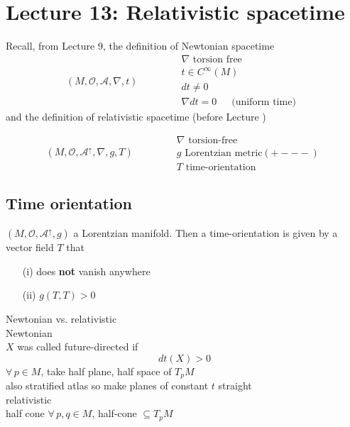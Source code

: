 \section{Lecture 13: Relativistic spacetime}

Recall, from Lecture 9, the definition of Newtonian spacetime
\[
(M, \mathcal{O}, \mathcal{A}, \nabla, t) \quad \quad \quad \, \begin{aligned}
& \nabla \text{ torsion free } \\
& t \in C^{\infty}(M) \\ 
& dt \neq 0 \\
& \nabla dt = 0   \quad \, \text{ (uniform time) }
\end{aligned}
\]
and the definition of relativistic spacetime (before Lecture )


\[
(M, \mathcal{O}, \mathcal{A}^{\uparrow}, \nabla, g, T ) \quad \quad \quad \, \begin{aligned}
& \nabla \text{ torsion-free } \\
& g \text{ Lorentzian metric} (+---) \\ 
& T \text{ time-orientation }
\end{aligned}
\]

\subsection{Time orientation}

\begin{definition}
  $(M,\mathcal{O},\mathcal{A}^{\uparrow},g)$ a Lorentzian manifold.  Then a time-orientation is given by a vector field $T$ that 
\begin{enumerate}
\item[(i)] does \textbf{not} vanish anywhere 
\item[(ii)] $g(T,T)>0$
\end{enumerate}
\end{definition}

Newtonian vs. relativistic \\
Newtonian \\
$X$ was called future-directed if 
\[
dt(X) >0
\]
$\forall \, p \in M$, take half plane, half space of $T_pM$ \\
also stratified atlas so make planes of constant $t$ straight \\
relativistic \\
half cone $\forall \, p, q \in M$, half-cone $\subseteq T_pM$ \\

